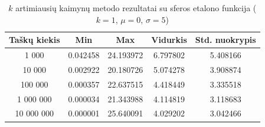 \begin{table}[H]
    \centering
    \begin{tabular}{|c|c|c|c|c|}
        \hline
        \textbf{Taškų kiekis} & \textbf{Min} & \textbf{Max} & \textbf{Vidurkis} & \textbf{Std. nuokrypis} \\ \hline
        1 000        & 0.042458 & 24.193972 & 6.797802 & 5.408166 \\ \hline
        10 000       & 0.002922 & 20.180726 & 5.074278 & 3.908874 \\ \hline
        100 000      & 0.000357 & 22.637515 & 4.418449 & 3.335518 \\ \hline
        1 000 000    & 0.000034 & 21.343988 & 4.114819 & 3.118683 \\ \hline
        10 000 000   & 0.000001 & 25.640091 & 4.029202 & 3.042466 \\ \hline
    \end{tabular}
    \caption{$k$ artimiausių kaimynų metodo rezultatai su sferos etalono funkcija ($k = 1$, $\mu = 0$, $\sigma = 5$)}
\end{table}
